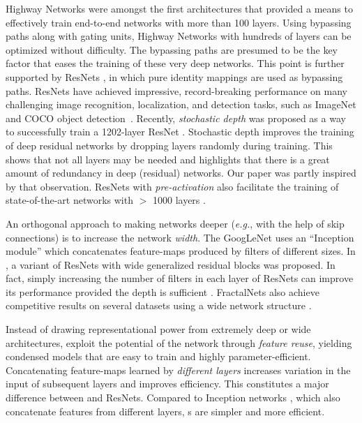 Highway Networks \cite{highway} were amongst the first architectures that provided a means to effectively train end-to-end networks with more than 100 layers. Using bypassing paths along with gating units, Highway Networks with hundreds of layers can be optimized without difficulty. The bypassing paths are presumed to be the key factor that eases the training of these very deep networks. This point is further supported by ResNets \cite{resnet}, in which pure identity mappings are used as bypassing paths. ResNets have achieved impressive, record-breaking performance on many challenging image recognition, localization, and detection tasks, such as ImageNet and COCO object detection~\cite{resnet}. Recently, \emph{stochastic depth} was proposed as a way to successfully train a 1202-layer ResNet \cite{stochastic}. Stochastic depth improves the training of deep residual networks by dropping layers randomly during training. This shows that not all layers may be needed and highlights that there is a great amount of redundancy in deep (residual) networks. Our paper was partly inspired by that observation. ResNets with \emph{pre-activation} also facilitate the training of state-of-the-art networks with $>$ 1000 layers \cite{identity-mappings}.

An orthogonal approach to making networks deeper (\emph{e.g.}, with the help of skip connections) is to increase the network \emph{width}. The GoogLeNet \cite{szegedy2015going,szegedy2015rethinking} uses an ``Inception module'' which concatenates feature-maps produced by filters of different sizes. In \cite{rir}, a variant of ResNets with wide generalized residual blocks was proposed. In fact, simply increasing the number of filters in each layer of ResNets can improve its performance provided the depth is sufficient \cite{wide}. FractalNets also achieve competitive results on several datasets using a wide network structure \cite{fractalnet}.

Instead of drawing representational power from extremely deep or wide architectures, \methodnameshorts{} exploit the potential of the network through \emph{feature reuse}, yielding condensed models that are easy to train and highly parameter-efficient. Concatenating feature-maps learned by \emph{different layers} increases variation in the input of subsequent layers and improves efficiency. This constitutes a major difference between \methodnameshorts{} and ResNets. Compared to Inception networks \cite{szegedy2015going,szegedy2015rethinking}, which also concatenate features from different layers, \methodnameshort{}s are simpler and more efficient.


